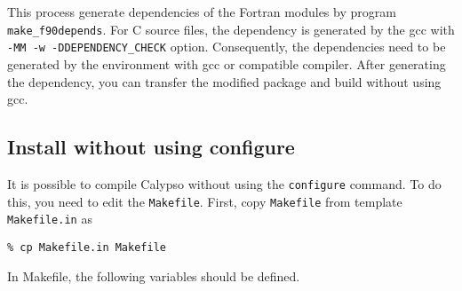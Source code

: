 This process generate dependencies of the Fortran modules by program \verb|make_f90depends|. For C source files, the dependency is generated by the gcc with \verb|-MM -w -DDEPENDENCY_CHECK| option. Consequently, the dependencies need to be generated by the environment with gcc or compatible compiler. After generating the dependency, you can transfer the modified package and build without using gcc.

\subsection{Install without using configure}
\label{section:no_configure}
It is possible to compile Calypso without using the \verb|configure| command. To do this, you need to edit the \verb|Makefile|. First, copy \verb|Makefile| from template \verb|Makefile.in| as
%
\begin{verbatim}
% cp Makefile.in Makefile
\end{verbatim}
In Makefile, the following variables should be defined.
%
